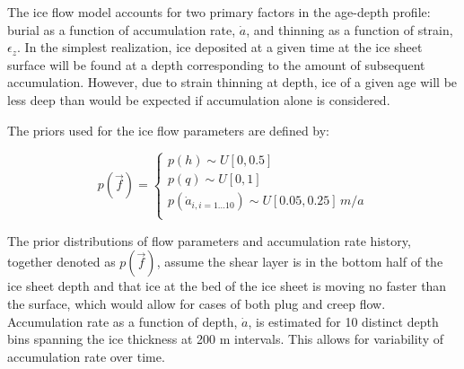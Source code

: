 The ice flow model accounts for two primary factors in the age-depth profile: burial as a function of accumulation rate, $\dot{a}$, and thinning as a function of strain, $\epsilon_z$. In the simplest realization, ice deposited at a given time at the ice sheet surface will be found at a depth corresponding to the amount of subsequent accumulation. However, due to strain thinning at depth, ice of a given age will be less deep than would be expected if accumulation alone is considered. 


The priors used for the ice flow parameters are defined by:

\begin{center}
\begin{equation}\label{priors}
p(\vec{f}) = 
\begin{cases}
p(h) \sim U[0, 0.5] \\
p(q) \sim U[0, 1] \\
p(\dot{a}_{i, i=1...10}) \sim U[0.05,0.25]\,m/a\\
\end{cases}	
\end{equation}	
\end{center}

The prior distributions of flow parameters and accumulation rate history, together denoted as $p(\vec{f})$, assume the shear layer is in the bottom half of the ice sheet depth \citep{cuffey2010} and that ice at the bed of the ice sheet is moving no faster than the surface, which would allow for cases of both plug and creep flow. Accumulation rate as a function of depth, $\dot{a}$, is estimated for 10 distinct depth bins spanning the ice thickness at 200 m intervals. This allows for variability of accumulation rate over time. 
